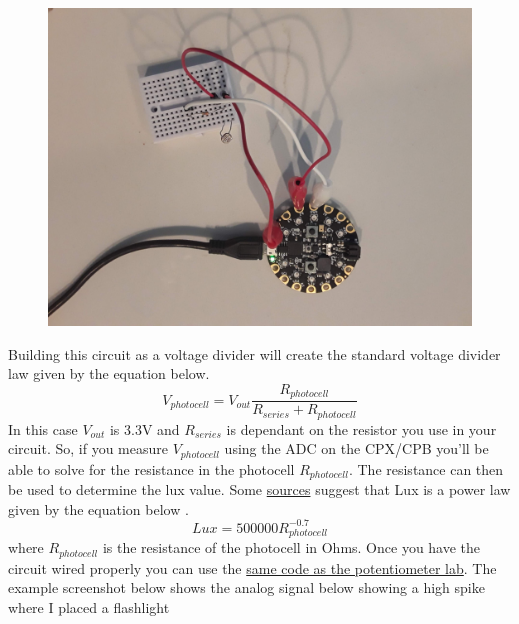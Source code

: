\begin{figure}[H]
  \begin{center}
    \includegraphics[width=\textwidth]{Figures/photocell_circuit.jpeg}
  \end{center}
\end{figure}
Building this circuit as a voltage divider will create the standard voltage divider law given by the equation below.
\begin{equation}
V_{photocell} = V_{out}\frac{R_{photocell}}{R_{series}+R_{photocell}}
\end{equation}
In this case $V_{out}$ is 3.3V and $R_{series}$ is dependant on the resistor you use in your circuit. So, if you measure $V_{photocell}$ using the ADC on the CPX/CPB you'll be able to solve for the resistance in the photocell $R_{photocell}$. The resistance can then be used to determine the lux value. Some \href{https://www.researchgate.net/publication/375038565_Measuring_the_Voltage_Current_and_Resistance_of_the_LDR_Sensor_through_the_Arduino_UNO}{sources} suggest that Lux is a power law given by the equation below \cite{photocell2023}.
\begin{equation}
Lux = 500000R_{photocell}^{-0.7}
\end{equation}
where $R_{photocell}$ is the resistance of the photocell in Ohms. Once you have the
circuit wired properly you can use
the \href{https://github.com/cmontalvo251/Microcontrollers/blob/master/Circuit_Playground/CircuitPython/Analog/analog_simple.py}{same
code as the potentiometer lab}. The example screenshot below shows the
analog signal below showing a high spike where I placed a flashlight
